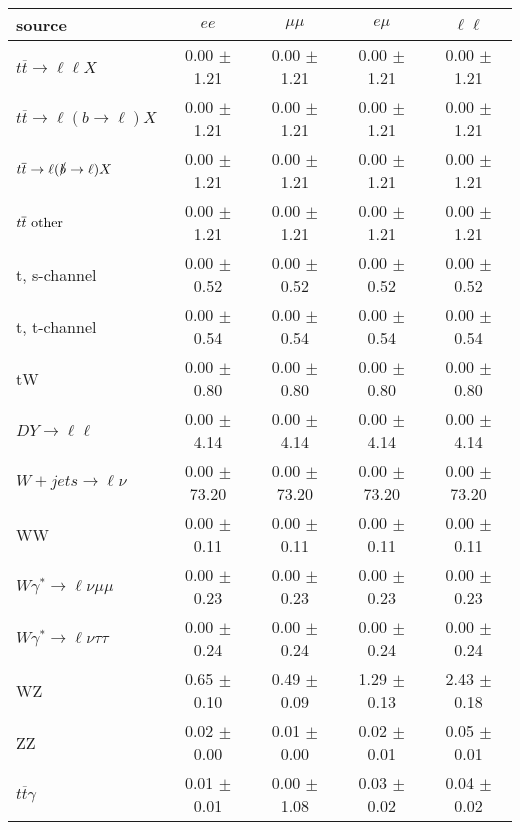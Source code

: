 \begin{tabular}{l|cccc} \hline\hline
source & $ee$ & $\mu\mu$ & $e\mu$ & $\ell\ell $ \\
\hline
$t\overline{t} \rightarrow \ell \ell X$ &  0.00 $\pm$  1.21 &  0.00 $\pm$  1.21 &  0.00 $\pm$  1.21 &  0.00 $\pm$  1.21 \\
$t\overline{t} \rightarrow \ell (b \rightarrow \ell) X$ &  0.00 $\pm$  1.21 &  0.00 $\pm$  1.21 &  0.00 $\pm$  1.21 &  0.00 $\pm$  1.21 \\
$t\overline{t} \rightarrow \ell (\slashed b \rightarrow \ell) X$ &  0.00 $\pm$  1.21 &  0.00 $\pm$  1.21 &  0.00 $\pm$  1.21 &  0.00 $\pm$  1.21 \\
        $t\overline{t}\ \rm{other}$ &  0.00 $\pm$  1.21 &  0.00 $\pm$  1.21 &  0.00 $\pm$  1.21 &  0.00 $\pm$  1.21 \\
\hline
                       t, s-channel &  0.00 $\pm$  0.52 &  0.00 $\pm$  0.52 &  0.00 $\pm$  0.52 &  0.00 $\pm$  0.52 \\
                       t, t-channel &  0.00 $\pm$  0.54 &  0.00 $\pm$  0.54 &  0.00 $\pm$  0.54 &  0.00 $\pm$  0.54 \\
                                 tW &  0.00 $\pm$  0.80 &  0.00 $\pm$  0.80 &  0.00 $\pm$  0.80 &  0.00 $\pm$  0.80 \\
\hline
         $DY \rightarrow \ell \ell$ &  0.00 $\pm$  4.14 &  0.00 $\pm$  4.14 &  0.00 $\pm$  4.14 &  0.00 $\pm$  4.14 \\
      $W+jets \rightarrow \ell \nu$ &  0.00 $\pm$ 73.20 &  0.00 $\pm$ 73.20 &  0.00 $\pm$ 73.20 &  0.00 $\pm$ 73.20 \\
                                 WW &  0.00 $\pm$  0.11 &  0.00 $\pm$  0.11 &  0.00 $\pm$  0.11 &  0.00 $\pm$  0.11 \\
\hline
$W\gamma^{*} \rightarrow \ell \nu \mu\mu$ &  0.00 $\pm$  0.23 &  0.00 $\pm$  0.23 &  0.00 $\pm$  0.23 &  0.00 $\pm$  0.23 \\
$W\gamma^{*} \rightarrow \ell \nu \tau\tau$ &  0.00 $\pm$  0.24 &  0.00 $\pm$  0.24 &  0.00 $\pm$  0.24 &  0.00 $\pm$  0.24 \\
                                 WZ &  0.65 $\pm$  0.10 &  0.49 $\pm$  0.09 &  1.29 $\pm$  0.13 &  2.43 $\pm$  0.18 \\
                                 ZZ &  0.02 $\pm$  0.00 &  0.01 $\pm$  0.00 &  0.02 $\pm$  0.01 &  0.05 $\pm$  0.01 \\
\hline
              $t\overline{t}\gamma$ &  0.01 $\pm$  0.01 &  0.00 $\pm$  1.08 &  0.03 $\pm$  0.02 &  0.04 $\pm$  0.02 \\

\end{tabular}
